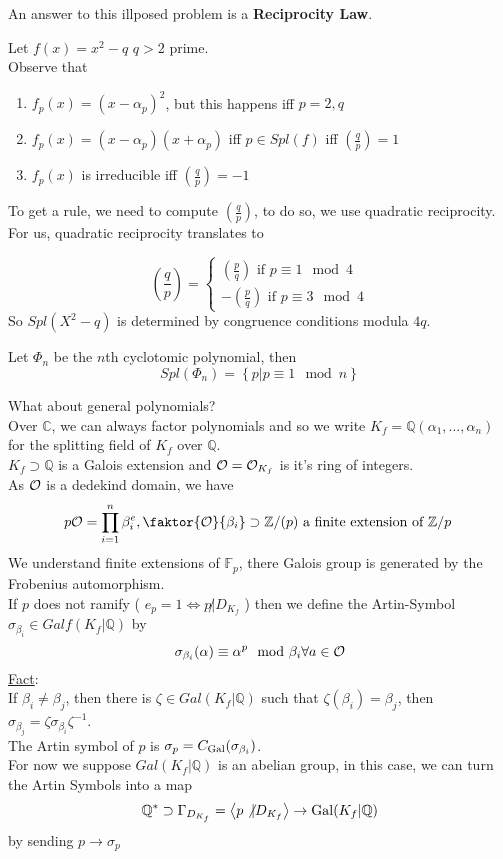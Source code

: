 \documentclass[../main.tex]{subfiles}
\begin{document}
An answer to this illposed problem is a \textbf{Reciprocity Law}.
\begin{exemple}
Let $f( x) = x^{2}-q$ $q>2 $ prime.\\
Observe that
\begin{enumerate}
\item $f_p( x) = ( x-\alpha_p)^{2}$, but this happens iff $p=2,q$ 
\item $f_p( x) = ( x-\alpha_p) ( x+\alpha_p) $ iff $p\in Spl( f) $ iff $( \frac{q}{p}) =1$
\item $f_p( x) $ is irreducible iff $( \frac{q}{p}) =-1$ 
\end{enumerate}
\end{exemple}
To get a rule, we need to compute $\left( \frac{q}{p}\right)$, to do so, we use quadratic reciprocity.
For us, quadratic reciprocity translates to
\begin{crly}
\[ 
	( \frac{q}{p}) =
	\begin{cases}
		( \frac{p}{q})  \text{ if } p \equiv 1 \mod 4\\
-( \frac{p}{q}) \text{ if } p \equiv 3 \mod 4
	\end{cases}
\]
So $Spl( X^{2}-q) $ is determined by congruence conditions modula $4q$.
\end{crly}
\begin{exemple}
Let $\Phi_n$ be the $n$th cyclotomic polynomial, then
\[ 
Spl( \Phi_n) = \left\{ p | p \equiv 1 \mod n \right\} 
\]
\end{exemple}
What about general polynomials?\\
Over $\mathbb{C}$, we can always factor polynomials and so we write $K_f= \mathbb{Q}( \alpha_1,\ldots,\alpha_n) $ for the splitting field of $K_f$ over $ \mathbb{Q}$.\\
$K_f \supset \mathbb{Q}$ is a Galois extension and $\mathcal{O} = \mathcal{O}_{K_f} $ is it's ring of integers.\\
As $\mathcal{O}$ is a dedekind domain, we have
\[ 
p\O = \prod_{i=1} ^{n} \beta_i^{e}, \faktor{\O}{\beta_i} \supset \mathbb{Z}/( p) \text{ a finite extension of $ \mathbb{Z}/p$  } 
\]
We understand finite extensions of $ \mathbb{F}_p$, there Galois group is generated by the Frobenius automorphism.\\
If $p$ does not ramify ( $e_p=1 \iff p\not| D_{K_f} $ ) then we define the Artin-Symbol $\sigma_{\beta_i} \in Galf( K_f | \mathbb{Q}) $ by 
\[ 
\sigma_{\beta_i} ( \alpha) \equiv \alpha ^{p}\mod \beta_i \forall a \in \mathcal{O}
\]
\underline{Fact}:\\
If $\beta_i \neq \beta_j$, then there is $\zeta \in Gal( K_f| \mathbb{Q}) $ such that $\zeta( \beta_i) = \beta_j$, then $\sigma_{\beta_j} = \zeta \sigma_{\beta_i} \zeta^{-1}$.\\
The Artin symbol of $p$ is $\sigma_p = C_{\operatorname{Gal}} ( \sigma_{\beta_i} ) $.\\
For now we suppose $Gal( K_f| \mathbb{Q}) $ is an abelian group, in this case, we can turn the Artin Symbols into a map
\[ 
	\mathbb{Q}^{*}\supset \Gamma_{D_{K_f}} = \left\langle p \not| D_{K_f} \right\rangle \to \operatorname{Gal}( K_f| \mathbb{Q}) 
\]
by sending $p \to \sigma_p$ 
\end{document}
